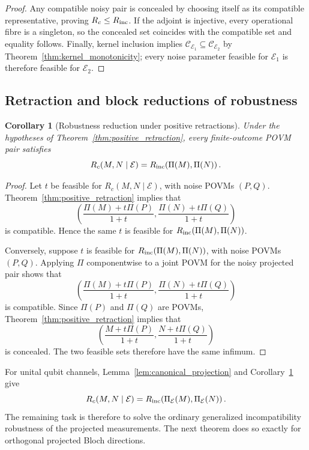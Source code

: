 \documentclass[
aps,pra,twocolumn,10pt,
superscriptaddress,longbibliography,floatfix
]{revtex4-2}
\newtheorem{corollary}[theorem]{Corollary}
\begin{document}
\begin{proof}
Any compatible noisy pair is concealed by choosing itself as its compatible representative, proving $R_c\le R_{\rm inc}$. If the adjoint is injective, every operational fibre is a singleton, so the concealed set coincides with the compatible set and equality follows. Finally, kernel inclusion implies $\mathcal C_{\mathcal E_1}\subseteq\mathcal C_{\mathcal E_2}$ by Theorem~\ref{thm:kernel_monotonicity}; every noise parameter feasible for $\mathcal E_1$ is therefore feasible for $\mathcal E_2$.
\end{proof}

\subsection{Retraction and block reductions of robustness}

\begin{corollary}[Robustness reduction under positive retractions]
\label{cor:positive_retraction_robustness}
Under the hypotheses of Theorem~\ref{thm:positive_retraction}, every finite-outcome POVM pair satisfies
\begin{equation}
R_c(M,N\mid\mathcal E)
=
R_{\rm inc}\!\left(\Pi(M),\Pi(N)\right).
\label{eq:positive_retraction_robustness}
\end{equation}
\end{corollary}

\begin{proof}
Let $t$ be feasible for $R_c(M,N\mid\mathcal E)$, with noise POVMs $(P,Q)$. Theorem~\ref{thm:positive_retraction} implies that
\[
\left(
\frac{\Pi(M)+t\Pi(P)}{1+t},
\frac{\Pi(N)+t\Pi(Q)}{1+t}
\right)
\]
is compatible. Hence the same $t$ is feasible for $R_{\rm inc}(\Pi(M),\Pi(N))$.

Conversely, suppose $t$ is feasible for $R_{\rm inc}(\Pi(M),\Pi(N))$, with noise POVMs $(P,Q)$. Applying $\Pi$ componentwise to a joint POVM for the noisy projected pair shows that
\[
\left(
\frac{\Pi(M)+t\Pi(P)}{1+t},
\frac{\Pi(N)+t\Pi(Q)}{1+t}
\right)
\]
is compatible. Since $\Pi(P)$ and $\Pi(Q)$ are POVMs, Theorem~\ref{thm:positive_retraction} implies that
\[
\left(
\frac{M+t\Pi(P)}{1+t},
\frac{N+t\Pi(Q)}{1+t}
\right)
\]
is concealed. The two feasible sets therefore have the same infimum.
\end{proof}

For unital qubit channels, Lemma~\ref{lem:canonical_projection} and Corollary~\ref{cor:positive_retraction_robustness} give
\begin{equation}
R_c(M,N\mid\mathcal E)
=
R_{\rm inc}\!\left(
\Pi_{\mathcal E}(M),
\Pi_{\mathcal E}(N)
\right).
\label{eq:projection_robustness_reduction}
\end{equation}
The remaining task is therefore to solve the ordinary generalized incompatibility robustness of the projected measurements. The next theorem does so exactly for orthogonal projected Bloch directions.
\end{document}
